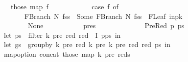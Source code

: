\begin{isabellebody}
\ \ \ \ \ \ \ \ \ \ those\ {\isacharparenleft}{\kern0pt}map\ {\isacharparenleft}{\kern0pt}{\isasymlambda}f{\isachardot}{\kern0pt}\isanewline
\ \ \ \ \ \ \ \ \ \ \ \ case\ f\ of\isanewline
\ \ \ \ \ \ \ \ \ \ \ \ \ \ FBranch\ N\ fss\ {\isasymRightarrow}\ Some\ {\isacharparenleft}{\kern0pt}FBranch\ N\ {\isacharparenleft}{\kern0pt}fss\ {\isacharat}{\kern0pt}\ {\isacharbrackleft}{\kern0pt}{\isacharbrackleft}{\kern0pt}FLeaf\ {\isacharparenleft}{\kern0pt}inp{\isacharbang}{\kern0pt}{\isacharparenleft}{\kern0pt}k{\isacharminus}{\kern0pt}{}{\isacharparenright}{\kern0pt}{\isacharparenright}{\kern0pt}{\isacharbrackright}{\kern0pt}{\isacharbrackright}{\kern0pt}{\isacharparenright}{\kern0pt}{\isacharparenright}{\kern0pt}\isanewline
\ \ \ \ \ \ \ \ \ \ \ \ {\isacharbar}{\kern0pt}\ {\isacharunderscore}{\kern0pt}\ {\isasymRightarrow}\ None\isanewline
\ \ \ \ \ \ \ \ \ \ {\isacharparenright}{\kern0pt}\ pres{\isacharparenright}{\kern0pt}\isanewline
\ \ \ \ \ \ \ \ {\isacharbraceright}{\kern0pt}{\isacharparenright}{\kern0pt}\isanewline
\ \ \ \ {\isacharbar}{\kern0pt}\ PreRed\ p\ ps\ {\isasymRightarrow}\ {\isacharparenleft}{\kern0pt}\isanewline
\ \ \ \ \ \ \ \ let\ ps{\isacharprime}{\kern0pt}\ {\isacharequal}{\kern0pt}\ filter\ {\isacharparenleft}{\kern0pt}{\isasymlambda}{\isacharparenleft}{\kern0pt}k{\isacharprime}{\kern0pt}{\isacharcomma}{\kern0pt}\ pre{\isacharcomma}{\kern0pt}\ red{\isacharparenright}{\kern0pt}{\isachardot}{\kern0pt}\ red\ {\isasymnotin}\ I{\isacharparenright}{\kern0pt}\ {\isacharparenleft}{\kern0pt}p{\isacharhash}{\kern0pt}ps{\isacharparenright}{\kern0pt}\ in\isanewline
\ \ \ \ \ \ \ \ let\ gs\ {\isacharequal}{\kern0pt}\ group{\isacharunderscore}{\kern0pt}by\ {\isacharparenleft}{\kern0pt}{\isasymlambda}{\isacharparenleft}{\kern0pt}k{\isacharprime}{\kern0pt}{\isacharcomma}{\kern0pt}\ pre{\isacharcomma}{\kern0pt}\ red{\isacharparenright}{\kern0pt}{\isachardot}{\kern0pt}\ {\isacharparenleft}{\kern0pt}k{\isacharprime}{\kern0pt}{\isacharcomma}{\kern0pt}\ pre{\isacharparenright}{\kern0pt}{\isacharparenright}{\kern0pt}\ {\isacharparenleft}{\kern0pt}{\isasymlambda}{\isacharparenleft}{\kern0pt}k{\isacharprime}{\kern0pt}{\isacharcomma}{\kern0pt}\ pre{\isacharcomma}{\kern0pt}\ red{\isacharparenright}{\kern0pt}{\isachardot}{\kern0pt}\ red{\isacharparenright}{\kern0pt}\ ps{\isacharprime}{\kern0pt}\ in\isanewline
\ \ \ \ \ \ \ \ map{\isacharunderscore}{\kern0pt}option\ concat\ {\isacharparenleft}{\kern0pt}those\ {\isacharparenleft}{\kern0pt}map\ {\isacharparenleft}{\kern0pt}{\isasymlambda}{\isacharparenleft}{\kern0pt}{\isacharparenleft}{\kern0pt}k{\isacharprime}{\kern0pt}{\isacharcomma}{\kern0pt}\ pre{\isacharparenright}{\kern0pt}{\isacharcomma}{\kern0pt}\ reds{\isacharparenright}{\kern0pt}{\isachardot}{\kern0pt}\isanewline

\end{isabellebody}
